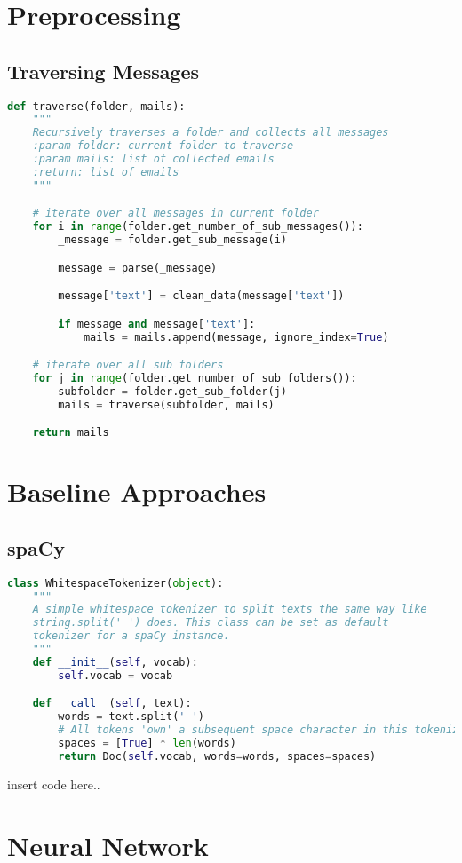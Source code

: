 \section{Preprocessing}

\subsection{Traversing Messages}

\begin{lstlisting}[language=Python, label={code:traverse}, caption=Recursively traversation of email folders]
def traverse(folder, mails):
    """
    Recursively traverses a folder and collects all messages
    :param folder: current folder to traverse
    :param mails: list of collected emails
    :return: list of emails
    """

    # iterate over all messages in current folder
    for i in range(folder.get_number_of_sub_messages()):
        _message = folder.get_sub_message(i)

        message = parse(_message)

        message['text'] = clean_data(message['text'])

        if message and message['text']:
            mails = mails.append(message, ignore_index=True)

    # iterate over all sub folders
    for j in range(folder.get_number_of_sub_folders()):
        subfolder = folder.get_sub_folder(j)
        mails = traverse(subfolder, mails)

    return mails
\end{lstlisting}

\section{Baseline Approaches}

\subsection{spaCy}

\begin{lstlisting}[language=Python, label={code:tokenizer}, caption=Custom whitespace tokenizer]
class WhitespaceTokenizer(object):
    """
    A simple whitespace tokenizer to split texts the same way like
    string.split(' ') does. This class can be set as default
    tokenizer for a spaCy instance.
    """
    def __init__(self, vocab):
        self.vocab = vocab

    def __call__(self, text):
        words = text.split(' ')
        # All tokens 'own' a subsequent space character in this tokenizer
        spaces = [True] * len(words)
        return Doc(self.vocab, words=words, spaces=spaces)
\end{lstlisting}

insert code here..

\section{Neural Network}

